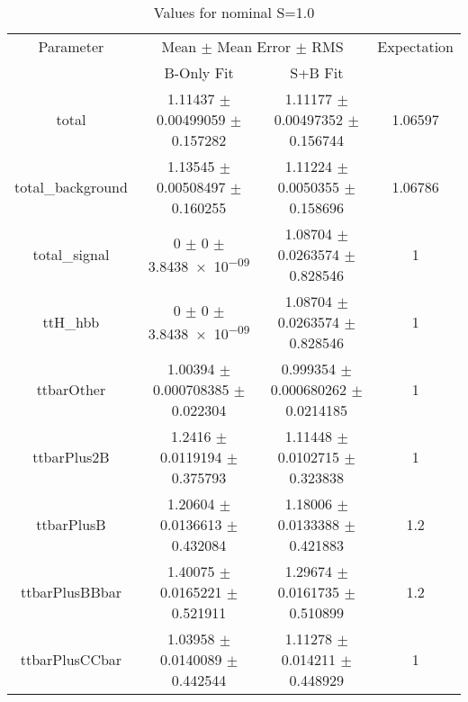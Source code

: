 \begin{table}
\centering
\caption{Values for nominal S=1.0}
\begin{tabular}{cccc}
\toprule
Parameter & \multicolumn{2}{c}{Mean $\pm$ Mean Error $\pm$ RMS} & Expectation\\
 & B-Only Fit & S+B Fit & \\
\midrule
total & \num{1.11437} $\pm$ \num{0.00499059} $\pm$ \num{0.157282} & \num{1.11177} $\pm$ \num{0.00497352} $\pm$ \num{0.156744} & \num{1.06597}\\
total\_background & \num{1.13545} $\pm$ \num{0.00508497} $\pm$ \num{0.160255} & \num{1.11224} $\pm$ \num{0.0050355} $\pm$ \num{0.158696} & \num{1.06786}\\
total\_signal & \num{0} $\pm$ \num{0} $\pm$ \num{3.8438e-09} & \num{1.08704} $\pm$ \num{0.0263574} $\pm$ \num{0.828546} & \num{1}\\
ttH\_hbb & \num{0} $\pm$ \num{0} $\pm$ \num{3.8438e-09} & \num{1.08704} $\pm$ \num{0.0263574} $\pm$ \num{0.828546} & \num{1}\\
ttbarOther & \num{1.00394} $\pm$ \num{0.000708385} $\pm$ \num{0.022304} & \num{0.999354} $\pm$ \num{0.000680262} $\pm$ \num{0.0214185} & \num{1}\\
ttbarPlus2B & \num{1.2416} $\pm$ \num{0.0119194} $\pm$ \num{0.375793} & \num{1.11448} $\pm$ \num{0.0102715} $\pm$ \num{0.323838} & \num{1}\\
ttbarPlusB & \num{1.20604} $\pm$ \num{0.0136613} $\pm$ \num{0.432084} & \num{1.18006} $\pm$ \num{0.0133388} $\pm$ \num{0.421883} & \num{1.2}\\
ttbarPlusBBbar & \num{1.40075} $\pm$ \num{0.0165221} $\pm$ \num{0.521911} & \num{1.29674} $\pm$ \num{0.0161735} $\pm$ \num{0.510899} & \num{1.2}\\
ttbarPlusCCbar & \num{1.03958} $\pm$ \num{0.0140089} $\pm$ \num{0.442544} & \num{1.11278} $\pm$ \num{0.014211} $\pm$ \num{0.448929} & \num{1}\\
\bottomrule
\end{tabular}
\end{table}